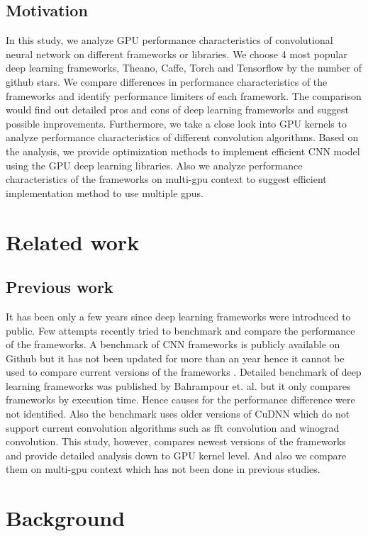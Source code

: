 \documentclass[conference]{IEEEtran}
\begin{document}
\subsection{Motivation}
In this study, we analyze GPU performance characteristics of convolutional neural network on different frameworks or libraries.
We choose 4 most popular deep learning frameworks, Theano, Caffe, Torch and Tensorflow by the number of github stars.
We compare differences in performance characteristics of the frameworks and identify performance limiters of each framework.
The comparison would find out detailed pros and cons of deep learning frameworks and suggest possible improvements.
Furthermore, we take a close look into GPU kernels to analyze performance characteristics of different convolution algorithms.
Based on the analysis, we provide optimization methods to implement efficient CNN model using the GPU deep learning libraries.
Also we analyze performance characteristics of the frameworks on multi-gpu context to suggest efficient implementation method to use multiple gpus.

\section{Related work}

\subsection{Previous work}
It has been only a few years since deep learning frameworks were introduced to public.
Few attempts recently tried to benchmark and compare the performance of the frameworks.
A benchmark of CNN frameworks is publicly available on Github but it has not been updated for more than an year hence it cannot be used to compare current versions of the frameworks \cite{}.
Detailed benchmark of deep learning frameworks was published by Bahrampour et. al. but it only compares frameworks by execution time.
Hence causes for the performance difference were not identified.
Also the benchmark uses older versions of CuDNN which do not support current convolution algorithms such as fft convolution and winograd convolution.
This study, however, compares newest versions of the frameworks and provide detailed analysis down to GPU kernel level.
And also we compare them on multi-gpu context which has not been done in previous studies.


\section{Background}
\end{document}
